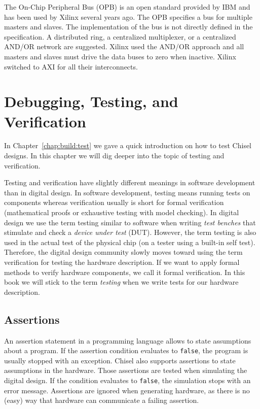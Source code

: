 \documentclass[%
    10pt,
    headinclude, footexclude,
    openright, %
    notitlepage,
    cleardoubleempty,
    headsepline,
    pointlessnumbers,
    bibtotoc, idxtotoc,
    ]{scrbook}
\newcommand{\code}[1]{{\small{\texttt{#1}}}}
\begin{document}
The On-Chip Peripheral Bus (OPB) \cite{soc:opb} is an open standard
provided by IBM and has been used by Xilinx several years ago.
The OPB specifies a bus for
multiple masters and slaves. The implementation of the bus is not
directly defined in the specification. A distributed ring, a
centralized multiplexer, or a centralized AND/OR network are
suggested. Xilinx used the AND/OR approach and all masters and
slaves must drive the data buses to zero when inactive.
Xilinx switched to AXI for all their interconnects.


\chapter{Debugging, Testing, and Verification}
\label{chap:testing}



In Chapter~\ref{chap:build:test} we gave a quick introduction on how to test
Chisel designs. In this chapter we will dig deeper into the topic of testing and
verification.

Testing and verification have slightly different meanings in software development
than in digital design. In software development, testing means running tests on components
whereas verification usually is short for formal verification (mathematical proofs or exhaustive testing
with model checking). In digital design we use the term testing similar to software when writing
\emph{test benches} that stimulate and check a \emph{device under test} (DUT). However, the term testing
is also used in the actual test of the physical chip (on a tester using a built-in self test).
Therefore, the digital design community slowly moves toward using the term verification for
testing the hardware description. If we want to apply formal methods to verify hardware
components, we call it formal verification. In this book we will stick to the term \emph{testing}
when we write tests for our hardware description.

\section{Assertions}

An assertion statement in a programming language allows to state assumptions about a program.
If the assertion condition evaluates to \code{false}, the program is usually stopped with an exception.
Chisel also supports assertions to state assumptions in the hardware. Those assertions are tested
when simulating the digital design. If the condition evaluates to \code{false}, the simulation stops
with an error message. Assertions are ignored when generating hardware, as there is no (easy) way that
hardware can communicate a failing assertion.
\end{document}
